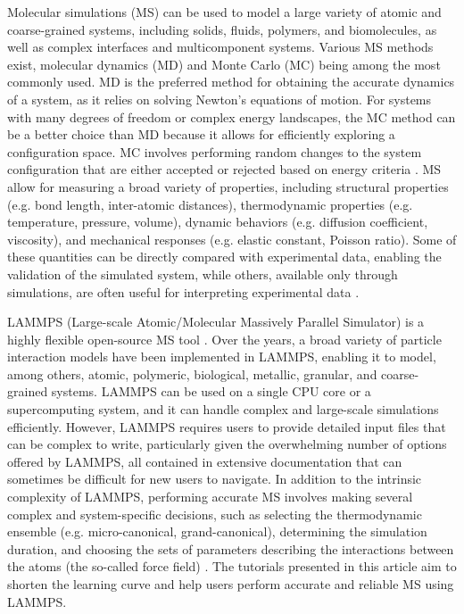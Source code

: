 \documentclass[9pt,tutorial]{livecoms}
\begin{document}

Molecular simulations (MS) can be used to model a large variety of atomic and coarse-grained systems, including solids, fluids, polymers, and biomolecules, as well as complex interfaces and multicomponent systems. Various MS methods exist, molecular dynamics (MD) and Monte Carlo (MC) being among the most commonly used. MD is the preferred method for obtaining the accurate dynamics of a system, as it relies on solving Newton's equations of motion. For systems with many degrees of freedom or complex energy landscapes, the MC method can be a better choice than MD because it allows for efficiently exploring a configuration space. MC involves performing random changes to the system configuration that are either accepted or rejected based on energy criteria \cite{frenkel2023understanding, allen2017computer}. MS allow for measuring a broad variety of properties, including structural properties (e.g. bond length, inter-atomic distances), thermodynamic properties (e.g. temperature, pressure, volume), dynamic behaviors (e.g. diffusion coefficient, viscosity), and mechanical responses (e.g. elastic constant, Poisson ratio). Some of these quantities can be directly compared with experimental data, enabling the validation of the simulated system, while others, available only through simulations, are often useful for interpreting experimental data  \cite{van2008molecular}.

LAMMPS (Large-scale Atomic/Molecular Massively Parallel Simulator) is a highly flexible open-source MS tool \cite{thompson2022lammps}. Over the years, a broad variety of particle interaction models have been implemented in LAMMPS, enabling it to model, among others, atomic, polymeric, biological, metallic, granular, and coarse-grained systems. LAMMPS can be used on a single CPU core or a supercomputing system, and it can handle complex and large-scale simulations efficiently. However, LAMMPS requires users to provide detailed input files that can be complex to write, particularly given the overwhelming number of options offered by LAMMPS, all contained in extensive documentation that can sometimes be difficult for new users to navigate. In addition to the intrinsic complexity of LAMMPS, performing accurate MS involves making several complex and system-specific decisions, such as selecting the thermodynamic ensemble (e.g. micro-canonical, grand-canonical), determining the simulation duration, and choosing the sets of parameters describing the interactions between the atoms (the so-called force field) \cite{van2018validation}. The tutorials presented in this article aim to shorten the learning curve and help users perform accurate and reliable MS using LAMMPS.
\end{document}
